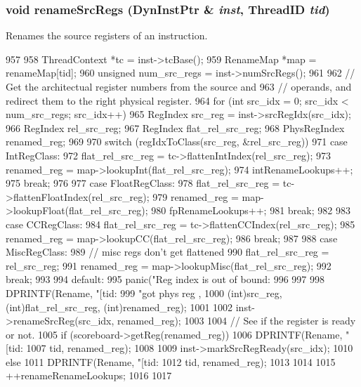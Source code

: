 \hypertarget{classDefaultRename_a8c18390fbeba66214f3854d7325a1d0e}{
\subsubsection[{renameSrcRegs}]{\setlength{\rightskip}{0pt plus 5cm}void renameSrcRegs ({\bf DynInstPtr} \& {\em inst}, \/  {\bf ThreadID} {\em tid})}}
\label{classDefaultRename_a8c18390fbeba66214f3854d7325a1d0e}
Renames the source registers of an instruction. 


\begin{DoxyCode}
957 {
958     ThreadContext *tc = inst->tcBase();
959     RenameMap *map = renameMap[tid];
960     unsigned num_src_regs = inst->numSrcRegs();
961 
962     // Get the architectual register numbers from the source and
963     // operands, and redirect them to the right physical register.
964     for (int src_idx = 0; src_idx < num_src_regs; src_idx++) {
965         RegIndex src_reg = inst->srcRegIdx(src_idx);
966         RegIndex rel_src_reg;
967         RegIndex flat_rel_src_reg;
968         PhysRegIndex renamed_reg;
969 
970         switch (regIdxToClass(src_reg, &rel_src_reg)) {
971           case IntRegClass:
972             flat_rel_src_reg = tc->flattenIntIndex(rel_src_reg);
973             renamed_reg = map->lookupInt(flat_rel_src_reg);
974             intRenameLookups++;
975             break;
976 
977           case FloatRegClass:
978             flat_rel_src_reg = tc->flattenFloatIndex(rel_src_reg);
979             renamed_reg = map->lookupFloat(flat_rel_src_reg);
980             fpRenameLookups++;
981             break;
982 
983           case CCRegClass:
984             flat_rel_src_reg = tc->flattenCCIndex(rel_src_reg);
985             renamed_reg = map->lookupCC(flat_rel_src_reg);
986             break;
987 
988           case MiscRegClass:
989             // misc regs don't get flattened
990             flat_rel_src_reg = rel_src_reg;
991             renamed_reg = map->lookupMisc(flat_rel_src_reg);
992             break;
993 
994           default:
995             panic("Reg index is out of bound: %
996         }
997 
998         DPRINTF(Rename, "[tid:%
999                 "got phys reg %
      ,
1000                 (int)src_reg, (int)flat_rel_src_reg, (int)renamed_reg);
1001 
1002         inst->renameSrcReg(src_idx, renamed_reg);
1003 
1004         // See if the register is ready or not.
1005         if (scoreboard->getReg(renamed_reg)) {
1006             DPRINTF(Rename, "[tid:%
1007                     tid, renamed_reg);
1008 
1009             inst->markSrcRegReady(src_idx);
1010         } else {
1011             DPRINTF(Rename, "[tid:%
1012                     tid, renamed_reg);
1013         }
1014 
1015         ++renameRenameLookups;
1016     }
1017 }
\end{DoxyCode}
